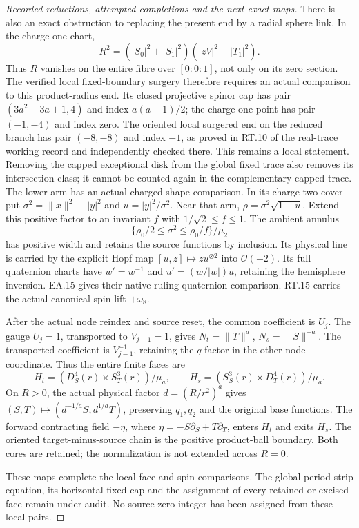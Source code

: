 \begin{proof}[Recorded reductions, attempted completions and the next exact maps]
There is also an exact obstruction to replacing the present
end by a radial sphere link. In the charge-one chart,
\[
 R^2=(|S_0|^2+|S_1|^2)(|zV|^2+|T_1|^2).
\]
Thus \(R\) vanishes on the entire fibre over
\([0:0:1]\), not only on its zero section. The verified
local fixed-boundary surgery therefore requires an actual
comparison to this product-radius end. Its closed
projective spinor cap has pair
\((3a^2-3a+1,4)\) and index \(a(a-1)/2\);
the charge-one point has pair \((-1,-4)\) and index zero.
The oriented local surgered end on the reduced branch
has pair \((-8,-8)\) and index \(-1\), as proved in
RT.10 of the real-trace working record and independently
checked there. This remains a local statement. Removing
the capped exceptional disk from the global fixed trace
also removes its intersection class; it cannot be counted
again in the complementary capped trace. The lower arm has an actual charged-shape comparison. In its
charge-two cover put \(\sigma^2=\|x\|^2+|y|^2\) and
\(u=|y|^2/\sigma^2\). Near that arm,
\(\rho=\sigma^2\sqrt{1-u}\). Extend this positive factor
to an invariant \(f\) with \(1/\sqrt2\le f\le1\).
The ambient annulus
\[
 \{\rho_0/2\le\sigma^2\le\rho_0/f\}/\mu_2
\]
has positive width and retains the source functions by inclusion.
Its physical line is carried by the explicit Hopf map
\([u,z]\mapsto z u^{\otimes2}\) into \(\mathcal O(-2)\).
Its full quaternion charts have \(w'=w^{-1}\) and
\(u'=(w/|w|)u\), retaining the hemisphere inversion.
EA.15 gives their native ruling-quaternion comparison.
RT.15 carries the actual canonical spin lift \(+\omega_8\).

After the actual node reindex and source reset, the common
coefficient is \(U_j\). The gauge \(U_j=1\), transported to
\(V_{j-1}=1\), gives \(N_t=\|T\|^a\), \(N_s=\|S\|^{-a}\).
The transported coefficient is \(V_{j-1}^{-1}\), retaining
the \(q\) factor in the other node coordinate. Thus the entire
finite faces are
\[
 H_t=(D^4_S(r)\times S^3_T(r))/\mu_a,\qquad
 H_s=(S^3_S(r)\times D^4_T(r))/\mu_a.
\]
On \(R>0\), the actual physical factor \(d=(R/r^2)^a\)
gives \((S,T)\mapsto(d^{-1/a}S,d^{1/a}T)\), preserving
\(q_1,q_2\) and the original base functions.
The forward contracting field \(-\eta\), where
\(\eta=-S\partial_S+T\partial_T\), enters \(H_t\) and
exits \(H_s\). The oriented target-minus-source chain is
the positive product-ball boundary. Both cores are retained;
the normalization is not extended across \(R=0\).

These maps complete the local face and spin comparisons.
The global period-strip equation, its horizontal fixed cap
and the assignment of every retained or excised face remain
under audit. No source-zero integer has been assigned from
these local pairs.


\end{proof}
